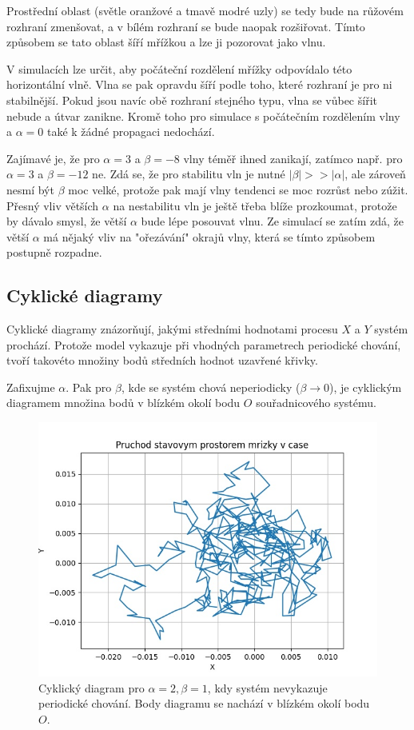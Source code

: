 \documentclass{article}
\begin{document}
Prostřední oblast (světle oranžové a tmavě modré uzly) se tedy bude na růžovém rozhraní zmenšovat, a v bílém rozhraní se bude naopak rozšiřovat. Tímto způsobem se tato oblast šíří mřížkou a lze ji pozorovat jako vlnu.

V simulacích lze určit, aby počáteční rozdělení mřížky odpovídalo této horizontální vlně. Vlna se pak opravdu šíří podle toho, které rozhraní je pro ni stabilnější. Pokud jsou navíc obě rozhraní stejného typu, vlna se vůbec šířit nebude a útvar zanikne. Kromě toho pro simulace s počátečním rozdělením vlny a $\alpha = 0$ také k žádné propagaci nedochází.

Zajímavé je, že pro $\alpha = 3$ a $\beta = -8$ vlny téměř ihned zanikají, zatímco např. pro $\alpha = 3$ a $\beta = -12$ ne. Zdá se, že pro stabilitu vln je nutné $|\beta| >> |\alpha|$, ale zároveň nesmí být $\beta$ moc velké, protože pak mají vlny tendenci se moc rozrůst nebo zúžit. Přesný vliv větších $\alpha$ na nestabilitu vln je ještě třeba blíže prozkoumat, protože by dávalo smysl, že větší $\alpha$ bude lépe posouvat vlnu. Ze simulací se zatím zdá, že větší $\alpha$ má nějaký vliv na "ořezávání" okrajů vlny, která se tímto způsobem postupně rozpadne.

\subsection{Cyklické diagramy}
Cyklické diagramy znázorňují, jakými středními hodnotami procesu $X$ a $Y$ systém prochází. Protože model vykazuje při vhodných parametrech periodické chování, tvoří takovéto množiny bodů středních hodnot uzavřené křivky.

Zafixujme $\alpha$. Pak pro $\beta$, kde se systém chová neperiodicky ($\beta \rightarrow 0$), je cyklickým diagramem množina bodů v blízkém okolí bodu $O$ souřadnicového systému.

\begin{figure}[H]
 \includegraphics[scale=0.8]{cycle_a2b1}
 \caption{Cyklický diagram pro $\alpha=2, \beta=1$, kdy systém nevykazuje periodické chování. Body diagramu se nachází v blízkém okolí bodu $O$.}
\end{figure}
\end{document}
